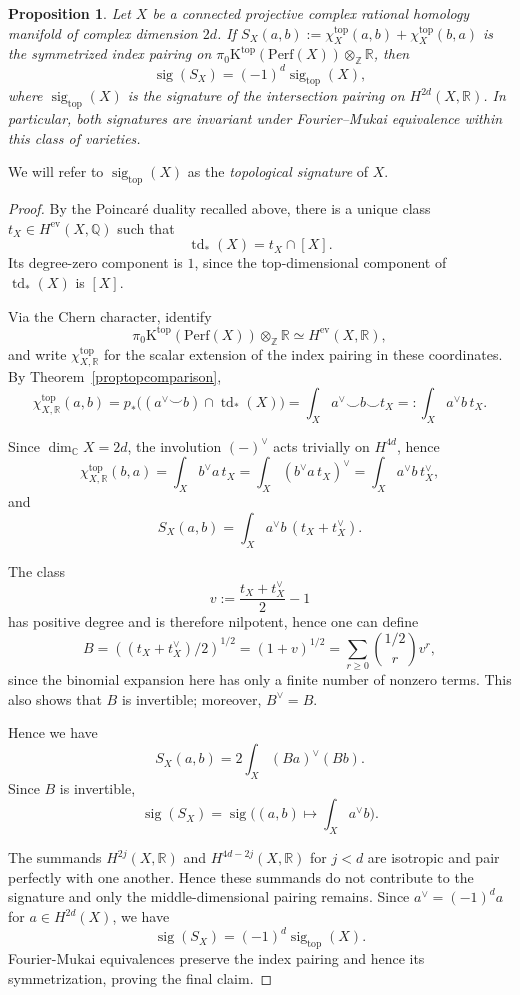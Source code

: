 \documentclass{amsart}
\theoremstyle{plain}
\newtheorem{prop}{Proposition}[section]
\theoremstyle{definition}
\newcommand{\bbC}{\mathbb{C}}
\newcommand{\bbQ}{\mathbb{Q}}
\newcommand{\bbZ}{\mathbb{Z}}
\newcommand{\Perf}{\mathrm{Perf}}
\newcommand{\K}{\mathrm{K}}
\DeclareMathOperator{\td}{td}
\DeclareMathOperator{\sig}{sig}
\begin{document}
\begin{prop}\label{propcategoricalsignature}
Let $X$ be a connected projective complex rational homology manifold of complex dimension $2d$. If $S_X(a,b):=\chi_X^{\mathrm{top}}(a,b)
+\chi_X^{\mathrm{top}}(b,a)$ is the symmetrized index pairing on
$\pi_0\K^{\mathrm{top}}(\Perf(X))\otimes_{\bbZ}\mathbb R$, then
\[
\sig(S_X)=(-1)^d\sig_{\mathrm{top}}(X),
\]
where $\sig_{\mathrm{top}}(X)$ is the signature of the intersection pairing on $H^{2d}(X,\mathbb R)$. In particular, both signatures are invariant under Fourier--Mukai equivalence within this class of varieties.
\end{prop}

We will refer to $\sig_{\mathrm{top}}(X)$ as the \emph{topological signature} of $X$.

\begin{proof}
By the Poincar\'e duality recalled above, there is a unique class
$t_X\in H^{\mathrm{ev}}(X,\bbQ)$ such that
\[
\td_*(X)=t_X\cap[X].
\]
Its degree-zero component is $1$, since the top-dimensional component of $\td_*(X)$ is $[X]$.

Via the Chern character, identify
\[
\pi_0\K^{\mathrm{top}}(\Perf(X))\otimes_{\bbZ}\mathbb R
\simeq H^{\mathrm{ev}}(X,\mathbb R),
\]
and write $\chi_{X,\mathbb R}^{\mathrm{top}}$ for the scalar extension of the index pairing in these coordinates.
By Theorem~\ref{proptopcomparison},
\[
\chi_{X,\mathbb R}^{\mathrm{top}}(a,b)
=p_*\bigl((a^\vee\smile b)\cap\td_*(X)\bigr)=\int_X a^\vee\smile b\smile t_X=:\int_X a^\vee b\,t_X.
\]

Since $\dim_{\bbC}X=2d$, the involution $(-)^\vee$ acts trivially on $H^{4d}$, hence
\[
\chi_{X,\mathbb R}^{\mathrm{top}}(b,a)=\int_X b^\vee a\,t_X=\int_X(b^\vee a\,t_X)^\vee=\int_X a^\vee b\,t_X^\vee,
\]
and
\[
S_X(a,b)=\int_Xa^\vee b\,(t_X+t_X^\vee).
\]

The class
\[
v:=\frac{t_X+t_X^\vee}{2}-1
\]
has positive degree and is therefore nilpotent, hence one can define
\[
B=((t_X+t_X^\vee)/2)^{1/2} = (1+v)^{1/2} =\sum_{r\geq0}\binom{1/2}{r}v^r,
\]
since the binomial expansion here has only a finite number of nonzero terms. This also shows that $B$ is invertible; moreover, $B^\vee=B$.

Hence we have
\[
S_X(a,b)=2\int_X(Ba)^\vee(Bb).
\]
Since $B$ is invertible, \[\sig(S_X)=\sig\bigl((a,b)\mapsto\int_Xa^\vee b\bigr).\]

The summands $H^{2j}(X,\mathbb R)$ and
$H^{4d-2j}(X,\mathbb R)$ for $j<d$ are isotropic and pair perfectly with one another. Hence these summands do not contribute to the signature and only the middle-dimensional pairing remains.
Since $a^\vee=(-1)^da$ for $a\in H^{2d}(X)$, we have
\[
\sig(S_X)=(-1)^d\sig_{\mathrm{top}}(X).
\]
Fourier-Mukai equivalences preserve the index pairing and hence its symmetrization, proving the final claim.
\end{proof}
\end{document}
